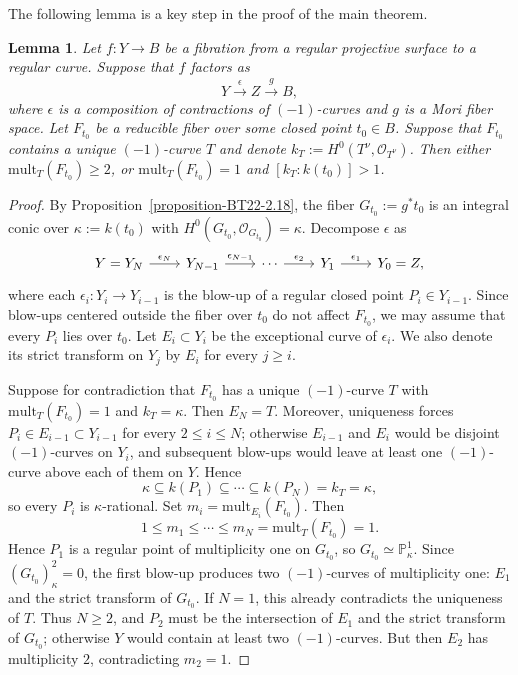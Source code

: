 \documentclass[reqno,oneside]{amsart}
\newtheorem{lemma}[theorem]{Lemma}
\theoremstyle{definition}
\theoremstyle{plain}
\numberwithin{equation}{section}
\begin{document}
\smallskip
The following lemma is a key step in the proof of the main theorem.
\begin{lemma}\label{lemma-reducible-fiber}
  Let $f\colon Y\to B$ be a fibration from a regular projective surface to a regular curve. Suppose that $f$ factors as
  \[
    Y\xrightarrow{\ \epsilon\ } Z\xrightarrow{\ g\ } B,
  \]
  where $\epsilon$ is a composition of contractions of $(-1)$-curves and $g$ is a Mori fiber space.
  Let $F_{t_0}$ be a reducible fiber over some closed point $t_0\in B$. 
  Suppose that $F_{t_0}$ contains a unique $(-1)$-curve $T$ and denote $k_T := H^0(T^\nu, \mathcal O_{T^\nu})$.
  Then either $\mathrm{mult}_T(F_{t_0})\ge2$, or $\mathrm{mult}_T(F_{t_0})=1$ and $[k_T:k(t_0)]>1$.
\end{lemma}
\begin{proof}
  By Proposition~\ref{proposition-BT22-2.18}, the fiber $G_{t_0}:=g^*t_0$ is an integral conic over $\kappa:=k(t_0)$ with $H^0(G_{t_0},\mathcal O_{G_{t_0}})=\kappa$.
  Decompose $\epsilon$ as
  \[
    \begin{tikzcd}[column sep=2.2em]
      Y=Y_N \ar[r,"\epsilon_N"]
      &Y_{N-1}\ar[r,"\epsilon_{N-1}"]
      &\cdots\ar[r,"\epsilon_2"]
      &Y_1\ar[r,"\epsilon_1"]
      &Y_0=Z,
    \end{tikzcd}
  \]
  where each $\epsilon_i\colon Y_i\to Y_{i-1}$ is the blow-up of a regular closed point $P_i\in Y_{i-1}$.
  Since blow-ups centered outside the fiber over $t_0$ do not affect $F_{t_0}$, we may assume that every $P_i$ lies over $t_0$.
  Let $E_i\subset Y_i$ be the exceptional curve of $\epsilon_i$.
  We also denote its strict transform on $Y_j$ by $E_i$ for every $j\geq i$.

  Suppose for contradiction that $F_{t_0}$ has a unique $(-1)$-curve $T$ with $\mathrm{mult}_T(F_{t_0})=1$ and $k_T=\kappa$.
  Then $E_N=T$. Moreover, uniqueness forces $P_i\in E_{i-1}\subset Y_{i-1}$ for every $2\leq i\leq N$; otherwise $E_{i-1}$ and $E_i$ would be disjoint $(-1)$-curves on $Y_i$, and subsequent blow-ups would leave at least one $(-1)$-curve above each of them on $Y$.
  Hence
  \[
    \kappa\subseteq k(P_1)\subseteq\cdots\subseteq k(P_N)=k_T=\kappa,
  \]
  so every $P_i$ is $\kappa$-rational.
  Set $m_i=\mathrm{mult}_{E_i}(F_{t_0})$. Then
  \[
    1\leq m_1\leq\cdots\leq m_N=\mathrm{mult}_T(F_{t_0})=1.
  \]
  Hence $P_1$ is a regular point of multiplicity one on $G_{t_0}$, so $G_{t_0}\simeq\mathbb P^1_\kappa$. Since $(G_{t_0})^2_\kappa=0$, the first blow-up produces two $(-1)$-curves of multiplicity one: $E_1$ and the strict transform of $G_{t_0}$.
  If $N=1$, this already contradicts the uniqueness of $T$. Thus $N\geq2$, and $P_2$ must be the intersection of $E_1$ and the strict transform of $G_{t_0}$; otherwise $Y$ would contain at least two $(-1)$-curves.
  But then $E_2$ has multiplicity $2$, contradicting $m_2=1$.
\end{proof}
\end{document}
